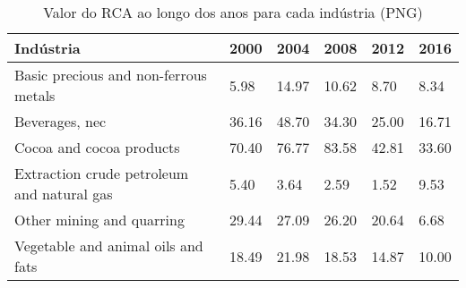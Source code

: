 \begin{table}
\centering
\caption{Valor do RCA ao longo dos anos para cada indústria (PNG)}
\label{tab:ex3-tempo-PNG}
\begin{tabular}{p{6cm}p{1.5cm}p{1.5cm}p{1.5cm}p{1.5cm}p{1.5cm}}
\toprule
                                 Indústria &  2000 &  2004 &  2008 &  2012 &  2016 \\
\midrule
     Basic precious and non-ferrous metals &  5.98 & 14.97 & 10.62 &  8.70 &  8.34 \\
                            Beverages, nec & 36.16 & 48.70 & 34.30 & 25.00 & 16.71 \\
                  Cocoa and cocoa products & 70.40 & 76.77 & 83.58 & 42.81 & 33.60 \\
Extraction crude petroleum and natural gas &  5.40 &  3.64 &  2.59 &  1.52 &  9.53 \\
                 Other mining and quarring & 29.44 & 27.09 & 26.20 & 20.64 &  6.68 \\
        Vegetable and animal oils and fats & 18.49 & 21.98 & 18.53 & 14.87 & 10.00 \\
\bottomrule
\end{tabular}
\end{table}
